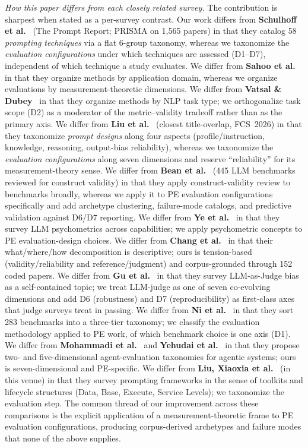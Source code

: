 \documentclass[acmsmall, nonacm, screen]{acmart}
\begin{document}
\textit{How this paper differs from each closely related survey.}
The contribution is sharpest when stated as a per-survey contrast.
Our work differs from \textbf{Schulhoff et al.}~\cite{schulhoff2024prompt}
(The Prompt Report; PRISMA on 1{,}565 papers) in that they catalog
58 \emph{prompting techniques} via a flat 6-group taxonomy, whereas
we taxonomize the \emph{evaluation configurations} under which
techniques are assessed (D1--D7), independent of which technique a
study evaluates. We differ from \textbf{Sahoo et
al.}~\cite{sahoo2024systematic} in that they organize methods by
application domain, whereas we organize evaluations by
measurement-theoretic dimensions. We differ from \textbf{Vatsal \&
Dubey}~\cite{vatsal2024survey} in that they organize methods by NLP
task type; we orthogonalize task scope (D2) as a moderator of the
metric--validity tradeoff rather than as the primary axis. We differ
from \textbf{Liu et al.}~\cite{liu2026taxonomy} (closest title-overlap,
FCS~2026) in that they taxonomize \emph{prompt designs} along four
aspects (profile/instruction, knowledge, reasoning, output-bias
reliability), whereas we taxonomize the \emph{evaluation
configurations} along seven dimensions and reserve ``reliability'' for
its measurement-theory sense. We differ from \textbf{Bean et
al.}~\cite{bean2025measuring} (445 LLM benchmarks reviewed for
construct validity) in that they apply construct-validity review to
benchmarks broadly, whereas we apply it to PE evaluation
configurations specifically and add archetype clustering, failure-mode
catalogs, and predictive validation against D6/D7 reporting. We
differ from \textbf{Ye et al.}~\cite{ye2025psychometrics} in that
they survey LLM psychometrics across capabilities; we apply
psychometric concepts to PE evaluation-design choices. We differ
from \textbf{Chang et al.}~\cite{chang2023survey} in that their
what/where/how decomposition is descriptive; ours is tension-based
(validity/reliability and reference/judgment) and corpus-grounded
through 152 coded papers. We differ from \textbf{Gu et
al.}~\cite{gu2025llmjudge} in that they survey LLM-as-Judge bias as
a self-contained topic; we treat LLM-judge as one of seven
co-evolving dimensions and add D6 (robustness) and D7
(reproducibility) as first-class axes that judge surveys treat in
passing. We differ from \textbf{Ni et al.}~\cite{ni2025benchmarks}
in that they sort 283 benchmarks into a three-tier taxonomy; we
classify the evaluation methodology applied to PE work, of which
benchmark choice is one axis (D1). We differ from \textbf{Mohammadi
et al.}~\cite{mohammadi2025agents} and \textbf{Yehudai et
al.}~\cite{yehudai2025agents} in that they propose two- and
five-dimensional agent-evaluation taxonomies for agentic systems;
ours is seven-dimensional and PE-specific. We differ from
\textbf{Liu, Xiaoxia et al.}~\cite{liu2024promptingframeworks} (in
this venue) in that they survey prompting frameworks in the sense of
toolkits and lifecycle structures (Data, Base, Execute, Service
Levels); we taxonomize the evaluation step. The common thread of
our improvement across these comparisons is the explicit application
of a measurement-theoretic frame to PE evaluation configurations,
producing corpus-derived archetypes and failure modes that none of
the above supplies.
\end{document}
